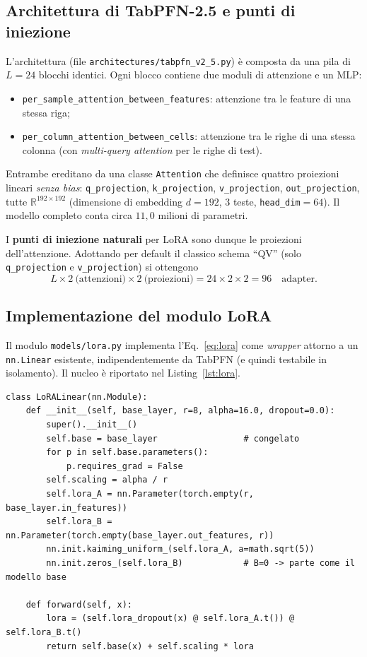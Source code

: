 \documentclass[11pt,a4paper]{article}
\begin{document}
\subsection{Architettura di TabPFN-2.5 e punti di iniezione}
\label{sec:arch}
L'architettura (file \texttt{architectures/tabpfn\_v2\_5.py}) è composta da una
pila di $L=24$ blocchi identici. Ogni blocco contiene due moduli di attenzione e
un MLP:
\begin{itemize}[nosep]
  \item \texttt{per\_sample\_attention\_between\_features}: attenzione tra le
  feature di una stessa riga;
  \item \texttt{per\_column\_attention\_between\_cells}: attenzione tra le righe
  di una stessa colonna (con \emph{multi-query attention} per le righe di test).
\end{itemize}
Entrambe ereditano da una classe \texttt{Attention} che definisce quattro
proiezioni lineari \emph{senza bias}: \texttt{q\_projection},
\texttt{k\_projection}, \texttt{v\_projection}, \texttt{out\_projection}, tutte
$\mathbb{R}^{192\times192}$ (dimensione di embedding $d=192$, $3$ teste,
\texttt{head\_dim}$=64$). Il modello completo conta circa $11{,}0$ milioni di
parametri.

I \textbf{punti di iniezione naturali} per LoRA sono dunque le proiezioni
dell'attenzione. Adottando per default il classico schema ``QV'' (solo
\texttt{q\_projection} e \texttt{v\_projection}) si ottengono
\[
  L \times 2~\text{(attenzioni)} \times 2~\text{(proiezioni)} = 24\times2\times2 = 96
  \quad\text{adapter}.
\]

\subsection{Implementazione del modulo LoRA}
Il modulo \texttt{models/lora.py} implementa l'Eq.~\eqref{eq:lora} come
\emph{wrapper} attorno a un \texttt{nn.Linear} esistente, indipendentemente da
TabPFN (e quindi testabile in isolamento). Il nucleo è riportato nel
Listing~\ref{lst:lora}.

\begin{lstlisting}[caption={Nucleo del wrapper \texttt{LoRALinear} (semplificato).},label=lst:lora]
class LoRALinear(nn.Module):
    def __init__(self, base_layer, r=8, alpha=16.0, dropout=0.0):
        super().__init__()
        self.base = base_layer                 # congelato
        for p in self.base.parameters():
            p.requires_grad = False
        self.scaling = alpha / r
        self.lora_A = nn.Parameter(torch.empty(r, base_layer.in_features))
        self.lora_B = nn.Parameter(torch.empty(base_layer.out_features, r))
        nn.init.kaiming_uniform_(self.lora_A, a=math.sqrt(5))
        nn.init.zeros_(self.lora_B)            # B=0 -> parte come il modello base

    def forward(self, x):
        lora = (self.lora_dropout(x) @ self.lora_A.t()) @ self.lora_B.t()
        return self.base(x) + self.scaling * lora
\end{lstlisting}
\end{document}
